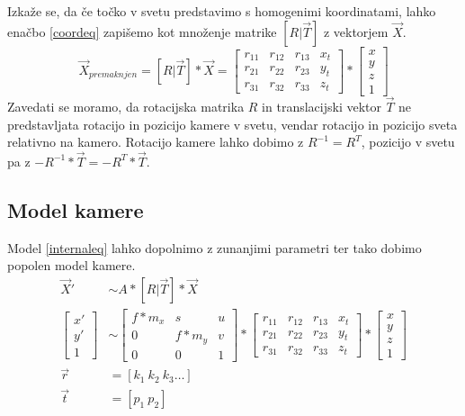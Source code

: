 \documentclass[a4paper, 12pt]{book}
\begin{document}
Izkaže se, da če točko v svetu predstavimo s homogenimi koordinatami, lahko enačbo \eqref{coordeq} zapišemo kot množenje matrike $[R | \vec{T}]$ z vektorjem $\vec{X}$.
\begin{equation}
\vec{X}_{premaknjen} = [R|\vec{T}] * \vec{X} = 
\begin{bmatrix}
r_{11} & r_{12} & r_{13} & x_t\\
r_{21} & r_{22} & r_{23} & y_t\\
r_{31} & r_{32} & r_{33} & z_t
\end{bmatrix}
* 
\begin{bmatrix}
x \\
y \\
z \\
1
\end{bmatrix}
\label{coordeq}
\end{equation}
Zavedati se moramo, da rotacijska matrika $R$ in translacijski vektor $\vec{T}$ ne predstavljata rotacijo in pozicijo kamere v svetu, vendar rotacijo in pozicijo sveta relativno na kamero. Rotacijo kamere lahko dobimo z $R^{-1} = R^T$, pozicijo v svetu pa z $-R^{-1} * \vec{T} = -R^T * \vec{T}$.

\subsection{Model kamere}

Model \eqref{internaleq} lahko dopolnimo z zunanjimi parametri ter tako dobimo popolen model kamere.
\begin{align}
\label{totalmodel}
\vec{X}' &\sim A * [R | \vec{T}] * \vec{X} \\
\begin{bmatrix}
x' \\
y' \\
1
\end{bmatrix}
&\sim
\begin{bmatrix}
f*m_x & s & u \\
0 & f*m_y & v \\
0 & 0 & 1
\end{bmatrix}
*
\begin{bmatrix}
r_{11} & r_{12} & r_{13} & x_t\\
r_{21} & r_{22} & r_{23} & y_t\\
r_{31} & r_{32} & r_{33} & z_t
\end{bmatrix}
*
\begin{bmatrix}
x \\
y \\
z \\
1
\end{bmatrix} \\
\vec{r} &= [k_1 \ k_2 \ k_3 \dots] \\
\vec{t} &= [p_1 \ p_2]
\end{align}
\end{document}
